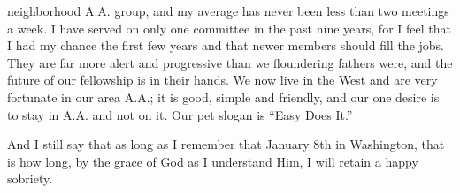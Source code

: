 \begin{biblechapter}
neighborhood A.A. group, and my average has never been less than two meetings a week. I have served on only one committee in the past nine years, for I feel that I had my chance the first few years and that newer members should fill the jobs. They are far more alert and progressive than we floundering fathers were, and the future of our fellowship is in their hands. We now live in the West and are very fortunate in our area A.A.; it is good, simple and friendly, and our one desire is to stay in A.A. and not on it. Our pet slogan is “Easy Does It.”

And I still say that as long as I remember that January 8th in Washington, that is how long, by the grace of God as I understand Him, I will retain a happy sobriety.
\end{biblechapter}
